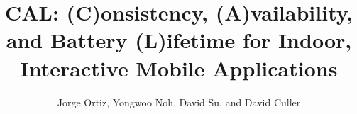 \documentclass[10pt,print,letterpaper]{sigplan-proc-varsize}
\begin{document}

\title{CAL: (C)onsistency, (A)vailability, and Battery (L)ifetime for Indoor, Interactive Mobile Applications}
\author{\alignauthor Jorge Ortiz, Yongwoo Noh, David Su, and David Culler\\
\\
 \\
} 



%
%
%
%
%
\end{document}
